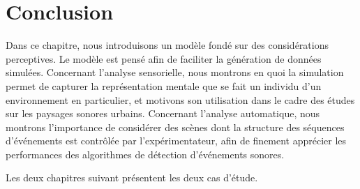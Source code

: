 \section{Conclusion}

Dans ce chapitre, nous introduisons un modèle fondé sur des considérations perceptives. Le modèle est pensé afin de faciliter la génération de données simulées. Concernant l'analyse sensorielle, nous montrons en quoi la simulation permet de capturer la représentation mentale que se fait un individu d'un environnement en particulier, et motivons son utilisation dans le cadre des études sur les paysages sonores urbains. Concernant l'analyse automatique, nous montrons l'importance de considérer des scènes dont la structure des séquences d'événements est contrôlée par l'expérimentateur, afin de finement apprécier les performances des algorithmes de détection d'événements sonores.

Les deux chapitres suivant présentent les deux cas d'étude.

